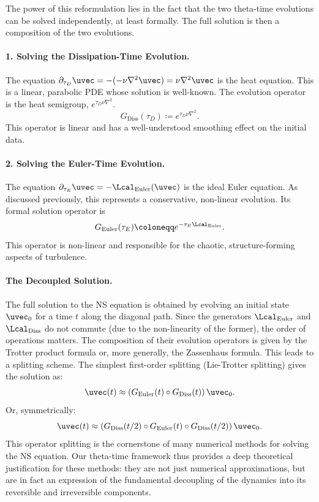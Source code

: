 The power of this reformulation lies in the fact that the two theta-time evolutions can be solved independently, at least formally. The full solution is then a composition of the two evolutions.

\paragraph{1. Solving the Dissipation-Time Evolution.}
The equation $\partial_{\tau_D} \uvec = -(-\nu \nabla^2 \uvec) = \nu \nabla^2 \uvec$ is the heat equation. This is a linear, parabolic PDE whose solution is well-known. The evolution operator is the heat semigroup, $e^{\tau_D \nu \nabla^2}$.
\begin{equation}
    G_{\text{Diss}}(\tau_D) \coloneqq e^{\tau_D \nu \nabla^2}.
\end{equation}
This operator is linear and has a well-understood smoothing effect on the initial data.

\paragraph{2. Solving the Euler-Time Evolution.}
The equation $\partial_{\tau_E} \uvec = -\Lcal_{\text{Euler}}(\uvec)$ is the ideal Euler equation. As discussed previously, this represents a conservative, non-linear evolution. Its formal solution operator is
\begin{equation}
    G_{\text{Euler}}(\tau_E) \coloneqq e^{-\tau_E \Lcal_{\text{Euler}}}.
\end{equation}
This operator is non-linear and responsible for the chaotic, structure-forming aspects of turbulence.

\paragraph{The Decoupled Solution.}
The full solution to the NS equation is obtained by evolving an initial state $\uvec_0$ for a time $t$ along the diagonal path. Since the generators $\Lcal_{\text{Euler}}$ and $\Lcal_{\text{Diss}}$ do not commute (due to the non-linearity of the former), the order of operations matters. The composition of their evolution operators is given by the Trotter product formula or, more generally, the Zassenhaus formula. This leads to a splitting scheme. The simplest first-order splitting (Lie-Trotter splitting) gives the solution as:
\begin{equation} \label{eq:split_solution}
    \uvec(t) \approx \left( G_{\text{Euler}}(t) \circ G_{\text{Diss}}(t) \right) \uvec_0.
\end{equation}
Or, symmetrically:
\begin{equation}
    \uvec(t) \approx \left( G_{\text{Diss}}(t/2) \circ G_{\text{Euler}}(t) \circ G_{\text{Diss}}(t/2) \right) \uvec_0.
\end{equation}
This operator splitting is the cornerstone of many numerical methods for solving the NS equation. Our theta-time framework thus provides a deep theoretical justification for these methods: they are not just numerical approximations, but are in fact an expression of the fundamental decoupling of the dynamics into its reversible and irreversible components.


